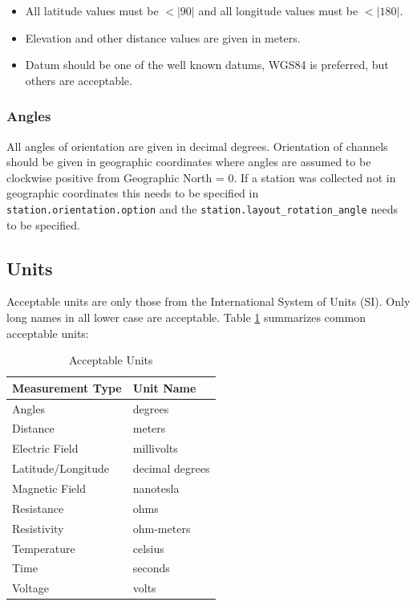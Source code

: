 \documentclass[12pt]{article}
\begin{document}
\begin{itemize}
	\setlength\itemsep{0em}
	\item All latitude values must be $<|90|$ and all longitude values must be $<|180|$.
	\item Elevation and other distance values are given in meters.
	\item Datum should be one of the well known datums, WGS84 is preferred, but others are acceptable.
\end{itemize} 

\subsubsection{Angles}

All angles of orientation are given in decimal degrees.  Orientation of channels should be given in geographic coordinates where angles are assumed to be clockwise positive from Geographic North = 0.  If a station was collected not in geographic coordinates this needs to be specified in \verb|station.orientation.option| and the \verb|station.layout_rotation_angle| needs to be specified.   

\subsection{Units}
Acceptable units are only those from the International System of Units (SI).  Only long names in all lower case are acceptable.  Table \ref{tab:units} summarizes common acceptable units:


\begin{table}[!h]
	\centering
	\caption[Acceptable Units]{Acceptable Units}
	\begin{tabular}{ll}
		\toprule
		\textbf{Measurement Type} & \textbf{Unit Name} \\ \midrule
		Angles & degrees \\ \midrule
		
		Distance &  meters  \\ \midrule
		Electric Field & millivolts\\ \midrule
		Latitude/Longitude & decimal degrees \\ \midrule
		Magnetic Field & nanotesla \\ \midrule
		Resistance & ohms   \\ \midrule
		Resistivity & ohm-meters \\ \midrule
		Temperature & celsius\\ \midrule
		Time & seconds\\ \midrule
		Voltage & volts \\ \bottomrule
		
		
	\end{tabular}
	\label{tab:units}
\end{table}
\end{document}
